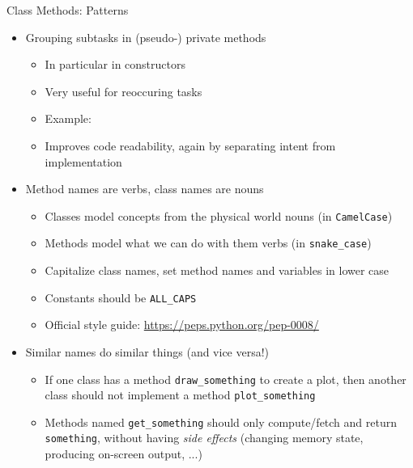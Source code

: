 \begin{frame}{Class Methods: Patterns}
%
\begin{itemize}
\item Grouping subtasks in (pseudo-) private methods
	\begin{itemize}
	\item In particular in constructors
	\item Very useful for reoccuring tasks
	\item Example: 
	\item Improves code readability, again by separating intent from implementation
	\end{itemize}
\item Method names are verbs, class names are nouns
	\begin{itemize}
	\item Classes model concepts from the physical world \Thus nouns (in \texttt{CamelCase})
	\item Methods model what we can do with them \Thus verbs (in \texttt{snake\_case})
	\item Capitalize class names, set method names and variables in lower case
	\item Constants should be \texttt{ALL\_CAPS}
	\item Official style guide: \url{https://peps.python.org/pep-0008/}
	\end{itemize}
\item Similar names do similar things (and vice versa!)
	\begin{itemize}
	\item If one class has a method \texttt{draw\_something} to create a plot, then another class should not implement a method \texttt{plot\_something}
	\item Methods named \texttt{get\_something} should only compute/fetch and return \texttt{something}, 
		without having \emph{side effects} (changing memory state, producing on-screen output, ...)
	\end{itemize}
\end{itemize}
%
\end{frame}


